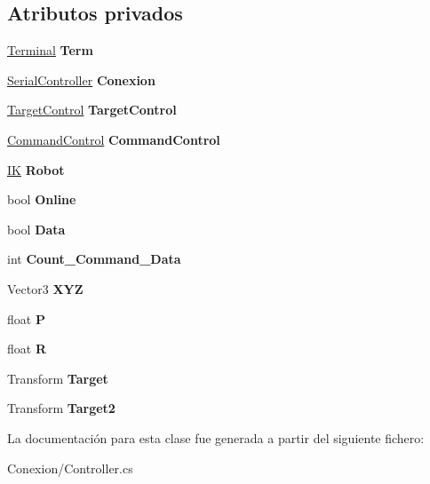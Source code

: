 \subsection*{Atributos privados}
\begin{DoxyCompactItemize}
\item 
\mbox{\label{class_controller_aceff4b20397af9f5d93540b9cd7b450a}} 
\mbox{\hyperlink{class_command_terminal_1_1_terminal}{Terminal}} {\bfseries Term}
\item 
\mbox{\label{class_controller_a2d11d60bd4def767d7b4c97a743a1d2f}} 
\mbox{\hyperlink{class_serial_controller}{Serial\+Controller}} {\bfseries Conexion}
\item 
\mbox{\label{class_controller_a0b9acebc208179483dd1853b3f285bf2}} 
\mbox{\hyperlink{class_target_control}{Target\+Control}} {\bfseries Target\+Control}
\item 
\mbox{\label{class_controller_a7cdb5c0c1303ce30d522aab86ea7647b}} 
\mbox{\hyperlink{class_command_control}{Command\+Control}} {\bfseries Command\+Control}
\item 
\mbox{\label{class_controller_ab0c8e0ad9d428ee4d2e5e319ab89a578}} 
\mbox{\hyperlink{class_i_k}{IK}} {\bfseries Robot}
\item 
\mbox{\label{class_controller_a8cc37c5a29d6e540741ef7142c994450}} 
bool {\bfseries Online}
\item 
\mbox{\label{class_controller_a3fb0a56f70db96f6dcfae1973789ada0}} 
bool {\bfseries Data}
\item 
\mbox{\label{class_controller_a7ef0e63a28bad654d55587785c86de81}} 
int {\bfseries Count\+\_\+\+Command\+\_\+\+Data}
\item 
\mbox{\label{class_controller_a0fdca594ef5cce610cf696b930e1fb91}} 
Vector3 {\bfseries X\+YZ}
\item 
\mbox{\label{class_controller_a9e04412e2e8ebae98859e5aed8b109f6}} 
float {\bfseries P}
\item 
\mbox{\label{class_controller_a9a81cea56c40bb6170c9d01b1a21b019}} 
float {\bfseries R}
\item 
\mbox{\label{class_controller_afcc92593ba6bdc37792a82f7c40f0f95}} 
Transform {\bfseries Target}
\item 
\mbox{\label{class_controller_ad3e4c3c8afaaa49d3c534050c63d47b1}} 
Transform {\bfseries Target2}
\end{DoxyCompactItemize}


La documentación para esta clase fue generada a partir del siguiente fichero\+:\begin{DoxyCompactItemize}
\item 
Conexion/Controller.\+cs\end{DoxyCompactItemize}
